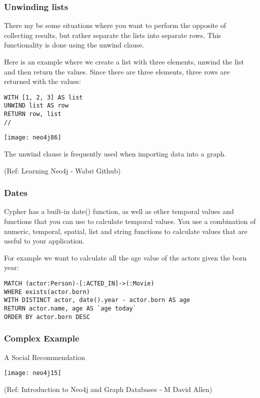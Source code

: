 \begin{frame}[fragile]\frametitle{Unwinding lists}

There my be some situations where you want to perform the opposite of collecting results, but rather separate the lists into separate rows. This functionality is done using the unwind clause.

Here is an example where we create a list with three elements, unwind the list and then return the values. Since there are three elements, three rows are returned with the values:

\begin{lstlisting}
WITH [1, 2, 3] AS list
UNWIND list AS row
RETURN row, list
//
\end{lstlisting}


\begin{center}
\texttt{[image: neo4j86]}
\end{center}	 

The unwind clause is frequently used when importing data into a graph.

 

{\tiny (Ref: Learning Neo4j - Wabri Github)}
\end{frame}

\begin{frame}[fragile]\frametitle{Dates}

Cypher has a built-in date() function, as well as other temporal values and functions that you can use to calculate temporal values. You use a combination of numeric, temporal, spatial, list and string functions to calculate values that are useful to your application.

For example we want to calculate all the age value of the actors given the born year:

\begin{lstlisting}
MATCH (actor:Person)-[:ACTED_IN]->(:Movie)
WHERE exists(actor.born)
WITH DISTINCT actor, date().year - actor.born AS age
RETURN actor.name, age AS `age today`
ORDER BY actor.born DESC
\end{lstlisting}

\end{frame}



\begin{frame}[fragile]\frametitle{Complex Example}
A Social Recommendation

\begin{center}
\texttt{[image: neo4j15]}
\end{center}	  


{\tiny (Ref: Introduction to Neo4j and Graph Databases
 - M David Allen)}

\end{frame}



